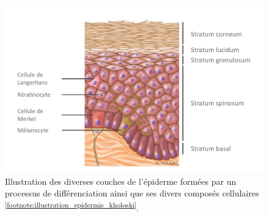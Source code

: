  \begin{figure}[H]
    \centering
    \includegraphics[width=0.9\linewidth]{contents/chapter_1/resources/illustration_epidermis_kholoski.pdf}
    \caption{Illustration des diverses couches de l'épiderme formées par un processus de différenciation ainsi que ses divers composés cellulaires \textsuperscript{\ref{footnote:illustration_epidermis_kholoski}}.}
    \label{fig:illustration_epidermis_kholoski}
\end{figure}\par

\addtocounter{footnote}{1}
\clearpage

